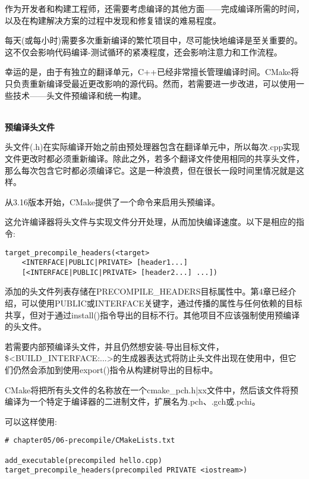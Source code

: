 
作为开发者和构建工程师，还需要考虑编译的其他方面——完成编译所需的时间，以及在构建解决方案的过程中发现和修复错误的难易程度。


每天(或每小时)需要多次重新编译的繁忙项目中，尽可能快地编译是至关重要的。这不仅会影响代码编译-测试循环的紧凑程度，还会影响注意力和工作流程。

幸运的是，由于有独立的翻译单元，C++已经非常擅长管理编译时间。CMake将只负责重新编译受最近更改影响的源代码。然而，若需要进一步改进，可以使用一些技术——头文件预编译和统一构建。

\hspace*{\fill} \\ %
\noindent
\textbf{预编译头文件}

头文件(.h)在实际编译开始之前由预处理器包含在翻译单元中，所以每次.cpp实现文件更改时都必须重新编译。除此之外，若多个翻译文件使用相同的共享头文件，那么每次包含它时都必须编译它。这是一种浪费，但在很长一段时间里情况就是这样。

从3.16版本开始，CMake提供了一个命令来启用头预编译。

这允许编译器将头文件与实现文件分开处理，从而加快编译速度。以下是相应的指令:

\begin{lstlisting}[style=styleCMake]
target_precompile_headers(<target>
	<INTERFACE|PUBLIC|PRIVATE> [header1...]
	[<INTERFACE|PUBLIC|PRIVATE> [header2...] ...])
\end{lstlisting}

添加的头文件列表存储在PRECOMPILE\_HEADERS目标属性中。第4章已经介绍，可以使用PUBLIC或INTERFACE关键字，通过传播的属性与任何依赖的目标共享，但对于通过install()指令导出的目标不行。其他项目不应该强制使用预编译的头文件。

\begin{tcolorbox}[colback=blue!5!white,colframe=blue!75!black,title=重要的Note]
若需要内部预编译头文件，并且仍然想安装-导出目标文件，\$<BUILD\_INTERFACE:...>的生成器表达式将防止头文件出现在使用中，但它们仍然会添加到使用export()指令从构建树导出的目标中。
\end{tcolorbox}

CMake将把所有头文件的名称放在一个cmake\_pch.h|xx文件中，然后该文件将预编译为一个特定于编译器的二进制文件，扩展名为.pch、.gch或.pchi。

可以这样使用:

\begin{lstlisting}[style=styleCMake]
# chapter05/06-precompile/CMakeLists.txt

add_executable(precompiled hello.cpp)
target_precompile_headers(precompiled PRIVATE <iostream>)
\end{lstlisting}


